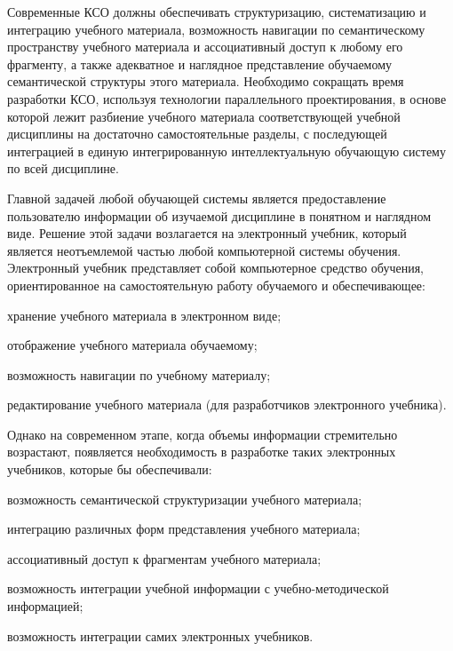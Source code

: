 Современные КСО должны обеспечивать структуризацию, систематизацию и интеграцию учебного материала, возможность навигации по семантическому пространству учебного материала и ассоциативный доступ к любому его фрагменту, а также адекватное и наглядное представление обучаемому семантической структуры этого материала. Необходимо сокращать время разработки КСО, используя технологии параллельного проектирования, в основе которой лежит разбиение учебного материала соответствующей учебной дисциплины на достаточно самостоятельные разделы, с последующей интеграцией в единую интегрированную интеллектуальную обучающую систему по всей дисциплине.

Главной задачей любой обучающей системы является предоставление пользователю информации об изучаемой дисциплине в понятном и наглядном виде. Решение этой задачи возлагается на электронный учебник, который является неотъемлемой частью любой компьютерной системы обучения. Электронный учебник представляет собой компьютерное средство обучения, ориентированное на самостоятельную работу обучаемого и обеспечивающее:

\begin{textitemize}
	\item хранение учебного материала в электронном виде;
	\item отображение учебного материала обучаемому;
	\item возможность навигации по учебному материалу;
	\item редактирование учебного материала (для разработчиков электронного учебника).
\end{textitemize}

Однако на современном этапе, когда объемы информации стремительно возрастают, появляется необходимость в разработке таких электронных учебников, которые бы обеспечивали:

\begin{textitemize}
	\item возможность семантической структуризации учебного материала;
	\item интеграцию различных форм представления учебного материала;
	\item ассоциативный доступ к фрагментам учебного материала;
	\item возможность интеграции учебной информации с учебно-методической информацией;
	\item возможность интеграции самих электронных учебников.
\end{textitemize}

